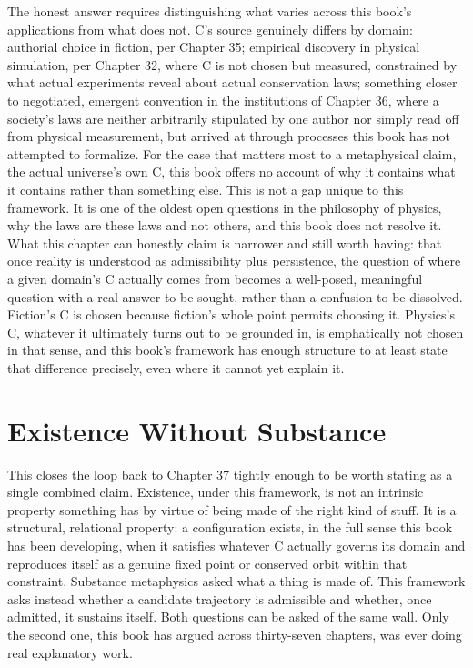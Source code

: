The honest answer requires distinguishing what varies across this book's applications from what does not. C's source genuinely differs by domain: authorial choice in fiction, per Chapter 35; empirical discovery in physical simulation, per Chapter 32, where C is not chosen but measured, constrained by what actual experiments reveal about actual conservation laws; something closer to negotiated, emergent convention in the institutions of Chapter 36, where a society's laws are neither arbitrarily stipulated by one author nor simply read off from physical measurement, but arrived at through processes this book has not attempted to formalize. For the case that matters most to a metaphysical claim, the actual universe's own C, this book offers no account of why it contains what it contains rather than something else. This is not a gap unique to this framework. It is one of the oldest open questions in the philosophy of physics, why the laws are these laws and not others, and this book does not resolve it. What this chapter can honestly claim is narrower and still worth having: that once reality is understood as admissibility plus persistence, the question of where a given domain's C actually comes from becomes a well-posed, meaningful question with a real answer to be sought, rather than a confusion to be dissolved. Fiction's C is chosen because fiction's whole point permits choosing it. Physics's C, whatever it ultimately turns out to be grounded in, is emphatically not chosen in that sense, and this book's framework has enough structure to at least state that difference precisely, even where it cannot yet explain it.

\section{Existence Without Substance}

This closes the loop back to Chapter 37 tightly enough to be worth stating as a single combined claim. Existence, under this framework, is not an intrinsic property something has by virtue of being made of the right kind of stuff. It is a structural, relational property: a configuration exists, in the full sense this book has been developing, when it satisfies whatever C actually governs its domain and reproduces itself as a genuine fixed point or conserved orbit within that constraint. Substance metaphysics asked what a thing is made of. This framework asks instead whether a candidate trajectory is admissible and whether, once admitted, it sustains itself. Both questions can be asked of the same wall. Only the second one, this book has argued across thirty-seven chapters, was ever doing real explanatory work.

